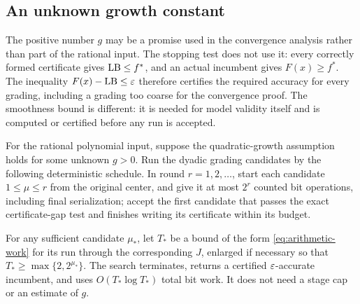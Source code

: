 \subsection{An unknown growth constant}

The positive number $g$ may be a promise used in the convergence analysis
rather than part of the rational input.  The stopping test does not use it:
every correctly formed certificate gives $\mathrm{LB}\le f^*$, and an actual
incumbent gives $F(x)\ge f^*$.  The inequality $F(x)-\mathrm{LB}\le\varepsilon$ therefore
certifies the required accuracy for every grading, including a grading too
coarse for the convergence proof.  The smoothness bound is different: it
is needed for model validity itself and is computed or certified before
any run is accepted.

\begin{proposition}
\label{prop:arithmetic-search}
For the rational polynomial input, suppose the quadratic-growth assumption
holds for some unknown $g>0$.  Run the dyadic grading candidates by the
following deterministic schedule.  In round $r=1,2,\ldots$, start each
candidate $1\le\mu\le r$ from the original center, and give it at most $2^r$
counted bit operations, including final serialization; accept the first
candidate that passes the exact certificate-gap test and finishes writing
its certificate within its budget.

For any sufficient candidate $\mu_*$, let $T_*$ be a bound of the form
\cref{eq:arithmetic-work} for its run through the corresponding $J$, enlarged
if necessary so that $T_*\ge\max\{2,2^{\mu_*}\}$.  The search terminates,
returns a certified $\varepsilon$-accurate incumbent, and uses
$O(T_*\log T_*)$ total bit work.  It does not need a stage cap or an estimate
of $g$.
\end{proposition}

